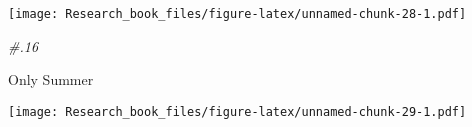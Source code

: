 \documentclass[]{book}
\newenvironment{Shaded}{\begin{snugshade}}{\end{snugshade}}
\newcommand{\KeywordTok}[1]{\textcolor[rgb]{0.13,0.29,0.53}{\textbf{#1}}}
\newcommand{\DataTypeTok}[1]{\textcolor[rgb]{0.13,0.29,0.53}{#1}}
\newcommand{\DecValTok}[1]{\textcolor[rgb]{0.00,0.00,0.81}{#1}}
\newcommand{\StringTok}[1]{\textcolor[rgb]{0.31,0.60,0.02}{#1}}
\newcommand{\CommentTok}[1]{\textcolor[rgb]{0.56,0.35,0.01}{\textit{#1}}}
\newcommand{\OperatorTok}[1]{\textcolor[rgb]{0.81,0.36,0.00}{\textbf{#1}}}
\newcommand{\NormalTok}[1]{#1}
\theoremstyle{definition}
\theoremstyle{definition}
\theoremstyle{definition}
\theoremstyle{remark}
\begin{document}
\texttt{[image: Research\_book\_files/figure-latex/unnamed-chunk-28-1.pdf]}

\begin{Shaded}
\begin{Highlighting}[]
\CommentTok{#.16}
\end{Highlighting}
\end{Shaded}

Only Summer

\begin{Shaded}
\end{Shaded}

\texttt{[image: Research\_book\_files/figure-latex/unnamed-chunk-29-1.pdf]}
\end{document}
